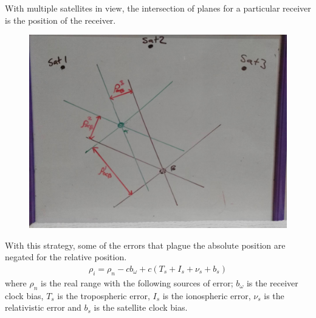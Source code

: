 With multiple satellites in view, the intersection of planes for a particular receiver is the position of the receiver.
\begin{figure}[h]
\centering
\caption{}
\label{fig:overall_multiS_duelR}
\includegraphics[width=0.7\linewidth]{ChapterLiteratureReview/overall_multiS_duelR.jpg}
\end{figure}

With this strategy, some of the errors that plague the absolute position are negated for the relative position. 
\begin{eqnarray}
\rho_i = \rho_n -cb_\omega + c(T_s + I_s+\nu_s+b_s)
\end{eqnarray}
where $\rho_n$ is the real range with the following sources of error; $b_\omega$ is the receiver clock bias, $T_s$ is the tropospheric error, $I_s$ is the ionospheric error, $\nu_s$ is the relativistic error and $b_s$ is the satellite clock bias.















